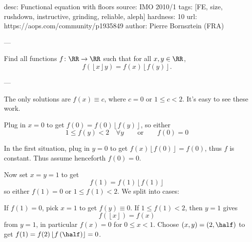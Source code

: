 desc:  Functional equation with floors
source:  IMO 2010/1
tags:  [FE, size, rushdown, instructive, grinding, reliable, aleph]
hardness: 10
url: https://aops.com/community/p1935849
author: Pierre Bornsztein (FRA)

---

Find all functions $f \colon \RR \to \RR$ such that for all $x,y \in \RR$,
\[ f(\left\lfloor x\right\rfloor y) = f(x)\left\lfloor f(y)\right\rfloor. \]

---

The only solutions are $f(x) \equiv c$,
where $c = 0$ or $1 \le c < 2$.
It's easy to see these work.

Plug in $x=0$ to get $f(0) = f(0) \left\lfloor f(y) \right\rfloor$,
so either
\[ 1 \le f(y) < 2 \quad \forall y
  \qquad\text{or}\qquad f(0) = 0 \]

In the first situation,
plug in $y=0$ to get $f(x) \left\lfloor f(0) \right\rfloor = f(0)$,
thus $f$ is constant.
Thus assume henceforth $f(0) = 0$.

Now set $x=y=1$ to get
\[ f(1) = f(1) \left\lfloor f(1) \right\rfloor \]
so either $f(1) = 0$ or $1 \le f(1) < 2$.
We split into cases:
\begin{itemize}
  \ii If $f(1) = 0$, pick $x=1$ to get $f(y) \equiv 0$.
  \ii If $1 \le f(1) < 2$,
  then $y=1$ gives
  \[ f(\left\lfloor x \right\rfloor) = f(x) \]
  from $y=1$, in particular $f(x) = 0$ for $0 \le x < 1$.
  Choose $(x,y) = \left( 2, \half \right)$ to get
  $f(1) = f(2) \left\lfloor f\left( \half \right) \right\rfloor = 0$.
\end{itemize}
